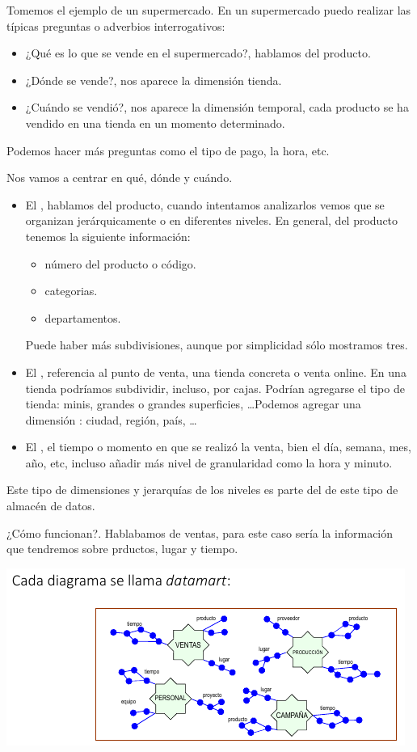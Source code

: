 Tomemos el ejemplo de un supermercado. En un supermercado puedo realizar las típicas preguntas o adverbios interrogativos:
\begin{itemize}
    \item ¿Qué es lo que se vende en el supermercado?, hablamos del producto.
    \item ¿Dónde se vende?, nos aparece la dimensión tienda.
    \item ¿Cuándo se vendió?, nos aparece la dimensión temporal, cada producto se ha vendido en una tienda en un momento determinado.
\end{itemize}

Podemos hacer más preguntas como el tipo de pago, la hora, etc.

Nos vamos a centrar en qué, dónde y cuándo.

\begin{itemize}
    \item El , hablamos del producto, cuando intentamos analizarlos vemos que se organizan jerárquicamente o en diferentes niveles. En general, del producto tenemos la siguiente información:
    \begin{itemize}
        \item número del producto o código.
        \item categorias.
        \item departamentos.
    \end{itemize}
    Puede haber más subdivisiones, aunque por simplicidad sólo mostramos tres.
    \item El , referencia al punto de venta, una tienda concreta o venta online. En una tienda podríamos subdividir, incluso, por cajas. Podrían agregarse el tipo de tienda: minis, grandes o grandes superficies, \ldots Podemos agregar una dimensión : ciudad, región, país, \ldots
    \item El , el tiempo o momento en que se realizó la venta, bien el día, semana, mes, año, etc, incluso añadir más nivel de granularidad como la hora y minuto.
\end{itemize}

Este tipo de dimensiones y jerarquías de los niveles es parte del  de este tipo de almacén de datos.

¿Cómo funcionan?. Hablabamos de ventas, para este caso sería la información que tendremos sobre prductos, lugar y tiempo. 

\begin{center}
    \includegraphics[scale=.8]{images/mod01-10.png}
\end{center}

